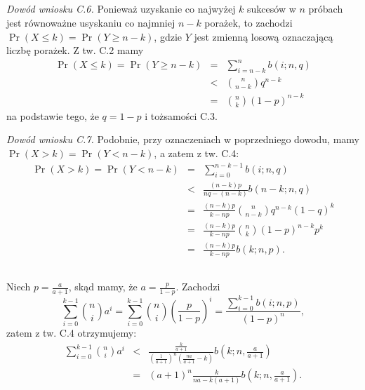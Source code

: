 \subsection{} %
\emph{Dowód wniosku C.6.} Ponieważ uzyskanie co najwyżej $k$ sukcesów w $n$ próbach jest równoważne usyskaniu co najmniej $n-k$ porażek, to zachodzi $\Pr(X\le k)=\Pr(Y\ge n-k)$, gdzie $Y$ jest zmienną losową oznaczającą liczbę porażek. Z tw. C.2 mamy
\begin{eqnarray*}
	\Pr(X\le k) = \Pr(Y\ge n-k) &=& \sum_{i=n-k}^nb(i;n,q) \\
	&<& \binom{n}{n-k}q^{n-k} \\
	&=& \binom{n}{k}(1-p)^{n-k}
\end{eqnarray*}
na podstawie tego, że $q=1-p$ i tożsamości C.3.

\emph{Dowód wniosku C.7.}
Podobnie, przy oznaczeniach w poprzedniego dowodu, mamy $\Pr(X>k) = \Pr(Y<n-k)$, a zatem z tw. C.4:
\begin{eqnarray*}
	\Pr(X>k) = \Pr(Y<n-k) &=& \sum_{i=0}^{n-k-1}b(i;n,q) \\
	&<& \frac{(n-k)p}{nq-(n-k)}b(n-k;n,q) \\
	&=& \frac{(n-k)p}{k-np}\binom{n}{n-k}q^{n-k}(1-q)^k \\
	&=& \frac{(n-k)p}{k-np}\binom{n}{k}(1-p)^{n-k}p^k \\
	&=& \frac{(n-k)p}{k-np}b(k;n,p).
\end{eqnarray*}

\subsection{} %
Niech $p=\frac{a}{a+1}$, skąd mamy, że $a=\frac{p}{1-p}$. Zachodzi
\[
	\sum_{i=0}^{k-1}\binom{n}{i}a^i = \sum_{i=0}^{k-1}\binom{n}{i}\left(\frac{p}{1-p}\right)^i = \frac{\sum_{i=0}^{k-1}b(i;n,p)}{(1-p)^n},
\]
zatem z tw. C.4 otrzymujemy:
\begin{eqnarray*}
	\sum_{i=0}^{k-1}\binom{n}{i}a^i &<& \frac{\frac{k}{a+1}}{\left(\frac{1}{a+1}\right)^n\left(\frac{na}{a+1}-k\right)}b\left(k;n,\frac{a}{a+1}\right) \\
	&=& (a+1)^n\frac{k}{na-k(a+1)}b\left(k;n,\frac{a}{a+1}\right).
\end{eqnarray*}

\subsection{} %
